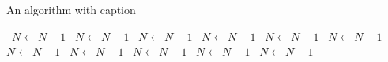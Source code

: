 \documentclass[a4paper]{article}
\begin{document}
\begin{algorithm}
\caption{An algorithm with caption}
\begin{algorithmic}
\    \State $N \gets N - 1$
\    \State $N \gets N - 1$
\    \State $N \gets N - 1$
\    \State $N \gets N - 1$
\    \State $N \gets N - 1$
\    \State $N \gets N - 1$
\    \State $N \gets N - 1$
\    \State $N \gets N - 1$
\    \State $N \gets N - 1$
\    \State $N \gets N - 1$
\    \State $N \gets N - 1$
\EndWhile
\end{algorithmic}
\end{algorithm}
\end{document}
